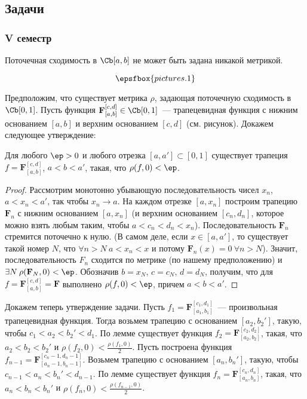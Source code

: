 \documentclass[a4paper]{article}
\begin{document}
\subsection*{Задачи}

\subsubsection*{V семестр}

\begin{nums}{-1}
\item Поточечная сходимость в $\Cb[a,b]$ не может быть задана никакой метрикой.
\def\trap[#1,#2][#3,#4]{\mathbf{F}_{[#1,#2]}^{[#3,#4]}}

\begin{solution}
$$\epsfbox{pictures.1}$$

Предположим, что существует метрика $\rho$, задающая поточечную сходимость в $\Cb[0,1]$. Пусть
функция $\trap[a,b][c,d]\in \Cb[0,1]$~--- трапецевидная функция с нижним основанием $[a,b]$ и
верхним основанием $[c,d]$ (см. рисунок). Докажем следующее утверждение:

\begin{lemma}
Для любого $\ep>0$ и любого отрезка $[a,a']\subset[0,1]$ существует трапеция $f=\trap[a,b][c,d]$,
$a<b<a'$, такая, что $\rho(f,0)<\ep$.
\end{lemma}
\begin{proof}
Рассмотрим монотонно убывающую последовательность чисел $x_n$,  $a<x_n<a'$, так чтобы
$x_n\rightarrow a$. На каждом отрезке $[a,x_n]$  построим трапецию $\mathbf{F}_n$ с нижним
основанием $[a,x_n]$ (и верхним основанием $[c_n,d_n]$, которое можно взять любым таким,  чтобы
$a<c_n<d_n<x_n$). Последовательность $\mathbf{F}_n$ стремится поточечно к нулю. (В самом деле, если
$x\in[a,a']$, то существует такой   номер $N$, что $\forall n>N\> a<x_n<x$ и потому
$\mathbf{F}_n(x)=0\>\forall n>N$). Значит, последовательность $F_n$ сходится по метрике (по нашему
предположению) и $\exists N\>\rho(\mathbf{F}_N,0)<\ep$. Обозначив $b=x_N$, $c=c_N$, $d=d_N$,
получим, что для $f=\trap[a,b][c,d]=\mathbf{F}$ выполнено $\rho(f,0)<\ep$, причем $a<b<a'$.
\end{proof}

Докажем теперь утверждение задачи. Пусть $f_1=\trap[a_1,b_1][c_1,d_1]$~--- произвольная
трапецевидная функция. Тогда возьмем трапецию с основанием $[a_2,b_2']$, такую, чтобы
$c_1<a_2<b_2'<d_1$. По лемме существует функция $f_2=\trap[a_2,b_2][c_2,d_2]$, такая, что
$a_2<b_2<b_2'$ и $\rho(f_2,0)<\frac{\textstyle\rho(f_1,0)}{\textstyle2}$. Пусть построена функция
$f_{n-1}=\trap[a_{n-1},b_{n-1}][c_{n-1},d_{n-1}]$. Возьмем трапецию с основанием $[a_n,b_n']$,
такую, чтобы $c_{n-1}<a_n<b_n'<d_{n-1}$. По лемме существует функция $f_n=\trap[a_n,b_n][c_n,d_n]$,
такая, что $a_n<b_n<b_n'$ и $\rho(f_n,0)<\frac{\textstyle\rho(f_{n-1},0)}{\textstyle2}$.


\end{solution}
\end{nums}
\end{document}
